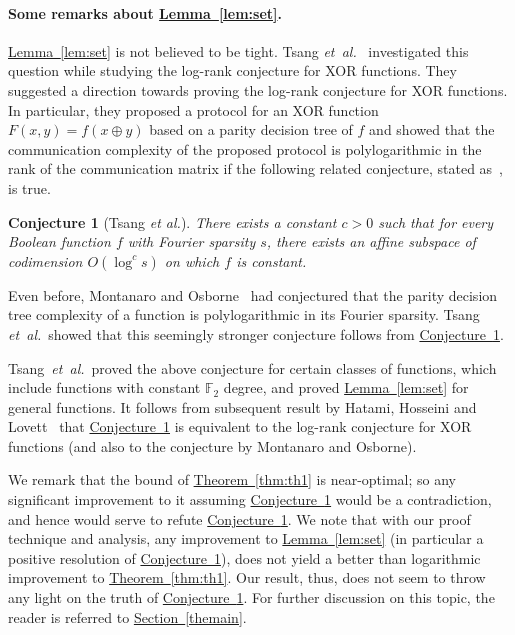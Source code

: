\documentclass[11pt]{article}
\numberwithin{equation}{section}
\newtheorem{conjecture}[theorem]{Conjecture}
\theoremstyle{definition}
\theoremstyle{plain}
\newcommand{\expref}[2]{\hyperref[#2]{#1~\ref{#2}}}
\newcommand{\etal}{{\it et~al.}}
\newcommand{\lref}[2][]{\hyperref[#2]{#1~\ref*{#2}}}
\begin{document}
\paragraph{Some remarks about \lref[Lemma]{lem:set}.}
%
\lref[Lemma]{lem:set} is not believed to be tight. 
Tsang \etal~\cite{tsang} investigated this question while studying
the log-rank conjecture for XOR functions. They suggested a direction towards proving
the log-rank conjecture for XOR
functions. In particular,
%
they  %
proposed a protocol for
an XOR function $F(x,y)=f(x \oplus y)$ based on a parity decision tree of $f$ and showed that the
communication complexity of the proposed protocol is polylogarithmic
in the rank of the communication matrix if the following related
%
%
conjecture, stated as~\cite[Conjecture~27]{tsang}, 
is true.
\begin{conjecture}[Tsang \emph{et al.}]    %
 \label{conj:tsang}
 There exists a constant $c > 0$ such that for every Boolean function
 $f$ with Fourier sparsity $s$, there exists an affine subspace of
 codimension $O\left(\log^c s\right)$ on which $f$ is constant.
\end{conjecture} 
Even before, Montanaro and Osborne~\cite{DBLP:journals/corr/abs-0909-3392} had conjectured that the parity decision tree complexity of a function is polylogarithmic in its Fourier sparsity. Tsang \etal\ showed that this seemingly stronger conjecture follows from \expref{Conjecture}{conj:tsang}.

Tsang~\etal~proved the above conjecture for certain classes of
functions, which include functions with constant $\mathbb{F}_2$
degree, and proved \lref[Lemma]{lem:set} for general functions. It follows from %
subsequent %
result by Hatami, Hosseini and Lovett~\cite{DBLP:conf/focs/HatamiHL16}
that \expref{Conjecture}{conj:tsang} is equivalent to the log-rank conjecture for XOR functions (and also to the conjecture by Montanaro and Osborne).


We remark that the bound of \lref[Theorem]{thm:th1} is near-optimal; so any significant improvement to it assuming \expref{Conjecture}{conj:tsang} would be a contradiction, and hence would serve to refute \lref[Conjecture]{conj:tsang}. We note that with our proof technique and analysis, any improvement
to \lref[Lemma]{lem:set} (in particular a positive resolution of
\lref[Conjecture]{conj:tsang}), does not yield a better than
logarithmic improvement to \lref[Theorem]{thm:th1}. Our result, thus, does not seem to throw any light on the truth of \lref[Conjecture]{conj:tsang}. For further
discussion on this topic, the reader is referred to \lref[Section]{themain}.
\end{document}
